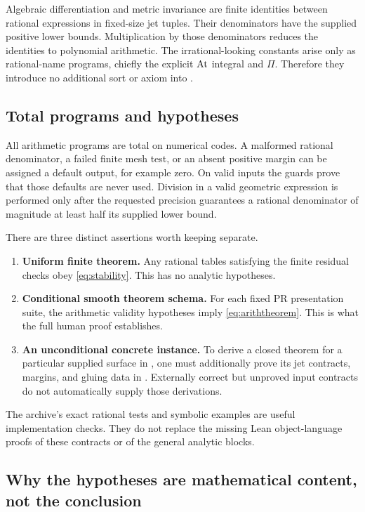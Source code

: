 Algebraic differentiation and metric invariance are finite identities between rational expressions in fixed-size jet tuples. Their denominators have the supplied positive lower bounds. Multiplication by those denominators reduces the identities to polynomial arithmetic. The irrational-looking constants arise only as rational-name programs, chiefly the explicit $\operatorname{At}$ integral and $\Pi$. Therefore they introduce no additional sort or axiom into \ipra.

\subsection{Total programs and hypotheses}

All arithmetic programs are total on numerical codes. A malformed rational denominator, a failed finite mesh test, or an absent positive margin can be assigned a default output, for example zero. On valid inputs the guards prove that those defaults are never used. Division in a valid geometric expression is performed only after the requested precision guarantees a rational denominator of magnitude at least half its supplied lower bound.

There are three distinct assertions worth keeping separate.
\begin{enumerate}
\item \textbf{Uniform finite theorem.} Any rational tables satisfying the finite residual checks obey \eqref{eq:stability}. This has no analytic hypotheses.
\item \textbf{Conditional smooth theorem schema.} For each fixed PR presentation suite, the arithmetic validity hypotheses imply \eqref{eq:ariththeorem}. This is what the full human proof establishes.
\item \textbf{An unconditional concrete instance.} To derive a closed theorem for a particular supplied surface in \ipra, one must additionally prove its jet contracts, margins, and gluing data in \ipra. Externally correct but unproved input contracts do not automatically supply those derivations.
\end{enumerate}
The archive's exact rational tests and symbolic examples are useful implementation checks. They do not replace the missing Lean object-language proofs of these contracts or of the general analytic blocks.

\subsection{Why the hypotheses are mathematical content, not the conclusion}

